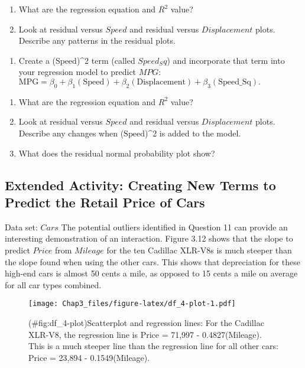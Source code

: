 \documentclass[
]{report}
\providecommand{\tightlist}{%
  \setlength{\itemsep}{0pt}\setlength{\parskip}{0pt}}
\begin{document}
\begin{enumerate}
\def\labelenumi{\alph{enumi}.}
\tightlist
\item
  What are the regression equation and \(R^2\) value?
\item
  Look at residual versus \(Speed\) and residual versus \(Displacement\) plots. Describe any patterns in the residual plots.
\end{enumerate}

\begin{enumerate}
\def\labelenumi{\arabic{enumi}.}
\setcounter{enumi}{39}
\tightlist
\item
  Create a (\(\mathrm{Speed}\))\^{}2 term (called \(Speed_Sq\)) and incorporate that term into your regression model to predict \(MPG\): \(\mathrm{MPG} = \beta_0 + \beta_1(\mathrm{Speed}) + \beta_2(\mathrm{Displacement}) + \beta_3(\mathrm{Speed\_Sq}).\)
\end{enumerate}

\begin{enumerate}
\def\labelenumi{\alph{enumi}.}
\tightlist
\item
  What are the regression equation and \(R^2\) value?
\item
  Look at residual versus \(Speed\) and residual versus \(Displacement\) plots. Describe any changes when (\(\mathrm{Speed}\))\^{}2 is added to the model.
\item
  What does the residual normal probability plot show?
\end{enumerate}

\subsection{Extended Activity: Creating New Terms to Predict the Retail Price of Cars}\label{extended-activity-creating-new-terms-to-predict-the-retail-price-of-cars}

Data set: \(Cars\)
The potential outliers identified in Question 11 can provide an interesting demonstration of an interaction. Figure 3.12 shows that the slope to predict \(Price\) from \(Mileage\) for the ten Cadillac XLR-V8s is much steeper than the slope found when using the other cars. This shows that depreciation for these high-end cars is almost 50 cents a mile, as opposed to 15 cents a mile on average for all car types combined.

\begin{figure}
\centering
\texttt{[image: Chap3\_files/figure-latex/df\_4-plot-1.pdf]}
\caption{(\#fig:df\_4-plot)Scatterplot and regression lines: For the Cadillac XLR-V8, the regression line is Price = 71,997 - 0.4827(Mileage). This is a much steeper line than the regression line for all other cars: Price = 23,894 - 0.1549(Mileage).}
\end{figure}
\end{document}
